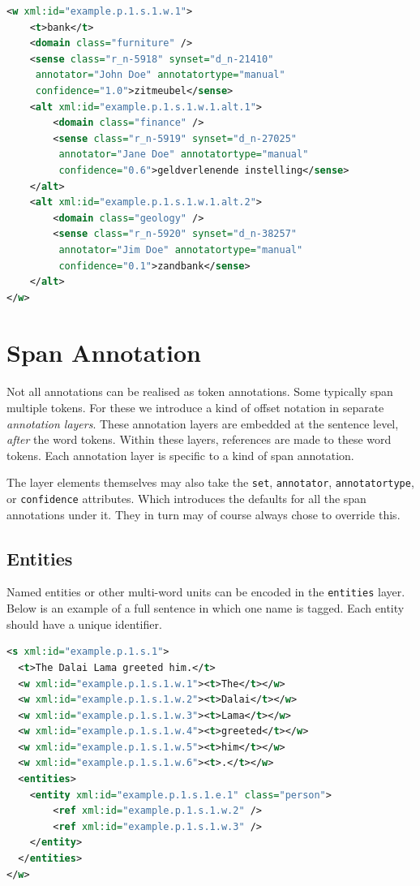 \documentclass[a4paper,12pt]{report}
\begin{document}
\begin{lstlisting}[language=xml]
<w xml:id="example.p.1.s.1.w.1">
    <t>bank</t>
    <domain class="furniture" />
    <sense class="r_n-5918" synset="d_n-21410" 
     annotator="John Doe" annotatortype="manual" 
     confidence="1.0">zitmeubel</sense>
    <alt xml:id="example.p.1.s.1.w.1.alt.1">
        <domain class="finance" />
        <sense class="r_n-5919" synset="d_n-27025"
         annotator="Jane Doe" annotatortype="manual" 
         confidence="0.6">geldverlenende instelling</sense>        
    </alt>
    <alt xml:id="example.p.1.s.1.w.1.alt.2">
        <domain class="geology" />
        <sense class="r_n-5920" synset="d_n-38257"
         annotator="Jim Doe" annotatortype="manual"
         confidence="0.1">zandbank</sense>        
    </alt>    
</w>
\end{lstlisting}


\section{Span Annotation}

Not all annotations can be realised as token annotations. Some typically span multiple tokens. For these we introduce a kind of offset notation in separate \emph{annotation layers}. These annotation layers are embedded at the sentence level, \emph{after} the word tokens. Within these layers, references are made to these word tokens. Each annotation layer is specific to a kind of span annotation.

The layer elements themselves may also take the \texttt{set}, \texttt{annotator}, \texttt{annotatortype}, or \texttt{confidence} attributes. Which introduces the defaults for all the span annotations under it. They in turn may of course always chose to override this.

\subsection{Entities}

Named entities or other multi-word units can be encoded in the \texttt{entities} layer. Below is an example of a full sentence in which one name is tagged. Each entity should have a unique identifier.


\begin{lstlisting}[language=xml]
<s xml:id="example.p.1.s.1">
  <t>The Dalai Lama greeted him.</t>
  <w xml:id="example.p.1.s.1.w.1"><t>The</t></w>
  <w xml:id="example.p.1.s.1.w.2"><t>Dalai</t></w>
  <w xml:id="example.p.1.s.1.w.3"><t>Lama</t></w>
  <w xml:id="example.p.1.s.1.w.4"><t>greeted</t></w>
  <w xml:id="example.p.1.s.1.w.5"><t>him</t></w>
  <w xml:id="example.p.1.s.1.w.6"><t>.</t></w>
  <entities>
    <entity xml:id="example.p.1.s.1.e.1" class="person">
        <ref xml:id="example.p.1.s.1.w.2" />
        <ref xml:id="example.p.1.s.1.w.3" />
    </entity>
  </entities>
</w>
\end{lstlisting}
\end{document}
